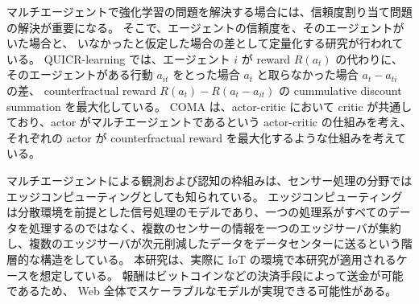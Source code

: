 マルチエージェントで強化学習の問題を解決する場合には、信頼度割り当て問題の解決が重要になる。
そこで、エージェントの信頼度を、そのエージェントがいた場合と、
いなかったと仮定した場合の差として定量化する研究が行われている。
QUICR-learning \citep{agogino2006quicr} では、エージェント $i$ が reward $R(a_t)$ の代わりに、
そのエージェントがある行動 $a_{it}$ をとった場合 $a_t$ と取らなかった場合 $a_t-a_{ti}$ の差、
counterfractual reward $R(a_t) - R(a_t - a_{it})$ の cummulative discount summation を最大化している。
COMA \citep{foerster2017counterfactual} は、actor-critic において critic が共通しており、actor がマルチエージェントであるという actor-critic の仕組みを考え、それぞれの actor が counterfractual reward を最大化するような仕組みを考えている。

マルチエージェントによる観測および認知の枠組みは、センサー処理の分野ではエッジコンピューティング\citep{bonomi2012fog}としても知られている。
エッジコンピューティングは分散環境を前提とした信号処理のモデルであり、一つの処理系がすべてのデータを処理するのではなく、複数のセンサーの情報を一つのエッジサーバが集約し、複数のエッジサーバが次元削減したデータをデータセンターに送るという階層的な構造をしている。
本研究は、実際に IoT の環境で本研究が適用されるケースを想定している。
報酬はビットコインなどの決済手段によって送金が可能であるため、
Web 全体でスケーラブルなモデルが実現できる可能性がある。
